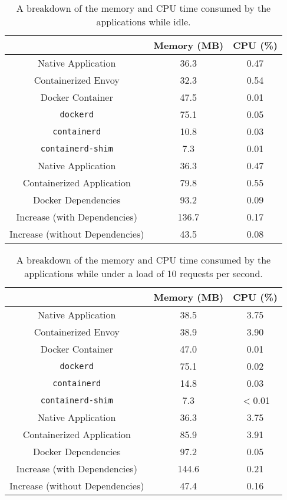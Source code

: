 \documentclass{article}
\begin{document}
\begin{table}[H]
\begin{tabular}{ |c|c|c| }
 \hline
   & Memory (MB) & CPU (\%) \\ 
 \hline
 Native Application & 36.3 & 0.47 \\
 \hline
 Containerized Envoy & 32.3 & 0.54 \\
 \hline
 Docker Container & 47.5 & 0.01 \\
 \hline
 \texttt{dockerd} & 75.1 & 0.05 \\
 \hline
 \texttt{containerd} & 10.8 & 0.03 \\
 \hline
 \texttt{containerd-shim} & 7.3 & 0.01 \\
 \hline\hline
 Native Application & 36.3 & 0.47 \\
 \hline
 Containerized Application & 79.8 & 0.55 \\
 \hline
 Docker Dependencies & 93.2 & 0.09 \\
 \hline\hline
 Increase (with Dependencies) & 136.7 & 0.17 \\
 \hline
 Increase (without Dependencies) & 43.5 & 0.08 \\
 \hline
\end{tabular}
\caption{A breakdown of the memory and CPU time consumed by the applications while idle.}
\label{idle-consumption-breakdown}
\end{table}

\begin{table}[H]
\begin{tabular}{ |c|c|c| }
 \hline
   & Memory (MB) & CPU (\%) \\ 
 \hline
 Native Application & 38.5 & 3.75 \\
 \hline
 Containerized Envoy & 38.9 & 3.90 \\
 \hline
 Docker Container & 47.0 & 0.01 \\
 \hline
 \texttt{dockerd} & 75.1 & 0.02 \\
 \hline
 \texttt{containerd} & 14.8 & 0.03 \\
 \hline
 \texttt{containerd-shim} & 7.3 & $<$0.01 \\
 \hline\hline
 Native Application & 36.3 & 3.75 \\
 \hline
 Containerized Application & 85.9 & 3.91 \\
 \hline
 Docker Dependencies & 97.2 & 0.05 \\
 \hline\hline
 Increase (with Dependencies) & 144.6 & 0.21 \\
 \hline
 Increase (without Dependencies) & 47.4 & 0.16 \\
 \hline
\end{tabular}
\caption{A breakdown of the memory and CPU time consumed by the applications while under a load of 10 requests per second.}
\label{consumption-breakdown-under-load-10}
\end{table}
\end{document}
